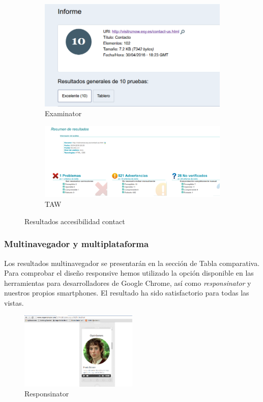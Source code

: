 		\begin{figure}
			\centering
			\begin{subfigure}{.5\textwidth}
				\centering
				\includegraphics[width=.8\linewidth]{./Fotos/exa-contact.png}
				\caption{Examinator}
				\label{fig: Examinator contact}
			\end{subfigure}%
			\begin{subfigure}{.5\textwidth}
				\centering
				\includegraphics[width=.8\linewidth]{./Fotos/taw-contact.png}
				\caption{TAW}
				\label{fig: TAW contactsub2}
			\end{subfigure}
			\caption{Resultados accesibilidad contact}
			\label{fig: Resultados accesibilidad contact}
		\end{figure}
\clearpage
\subsubsection{Multinavegador y multiplataforma}
Los resultados multinavegador se presentarán en la sección de Tabla comparativa.\\
Para comprobar el diseño responsive hemos utilizado la opción disponible en las herramientas para desarrolladores de Google Chrome, así como \textit{responsinator} y nuestros propios smartphones. El resultado ha sido satisfactorio para todas las vistas.

\begin{figure}[h]
	\centering
	\includegraphics[width=0.50\textwidth]{./Fotos/responsinator.png}
	\caption{Responsinator}
	\label{fig: Responsinator}
\end{figure}

